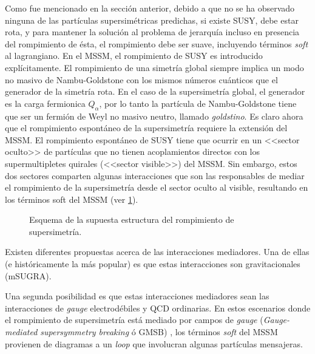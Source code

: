 Como fue mencionado en la sección anterior, debido a que no se ha observado
ninguna de las partículas supersimétricas predichas, si existe SUSY, debe estar
rota, y para mantener la solución al problema de jerarquía incluso en presencia
del rompimiento de ésta, el rompimiento debe ser suave, incluyendo términos
\emph{soft} al lagrangiano.
En el MSSM, el rompimiento de SUSY es introducido explícitamente. El rompimiento
de una simetría global siempre implica un modo no masivo de Nambu-Goldstone con
los mismos números cuánticos que el generador de la simetría rota. En el caso de
la supersimetría global, el generador es la carga fermionica $Q_\alpha$, por lo
tanto la partícula de Nambu-Goldstone tiene que ser un fermión de Weyl no masivo
neutro, llamado \emph{goldstino}. Es claro ahora que el rompimiento espontáneo
de la supersimetría requiere la extensión del MSSM. El rompimiento espontáneo de
SUSY tiene que ocurrir en un <<sector oculto>> de partículas que no tienen
acoplamientos directos con los supermultipletes quirales (<<sector visible>>)
del MSSM. Sin embargo, estos dos sectores comparten algunas interacciones que
son las responsables de mediar el rompimiento de la supersimetría desde el
sector oculto al visible, resultando en los términos soft del MSSM (ver
\cref{fig:susy_breaking}).

\begin{figure}[!htbp]
  \centering
  
  \caption{Esquema de la supuesta estructura del rompimiento de supersimetría.}
  \label{fig:susy_breaking}
\end{figure}

Existen diferentes propuestas acerca de las interacciones mediadores. Una
de ellas (e históricamente la más popular) es que estas interacciones son
gravitacionales (mSUGRA).

Una segunda posibilidad es que estas interacciones mediadores sean las
interacciones de \emph{gauge} electrodébiles y QCD ordinarias. En estos escenarios
donde el rompimiento de supersimetría está mediado por campos de \emph{gauge}
(\emph{Gauge-mediated supersymmetry breaking} ó GMSB) \cite{arxiv:9801271}, los términos
\emph{soft} del MSSM provienen de diagramas a un \emph{loop} que involucran algunas partículas
mensajeras.


